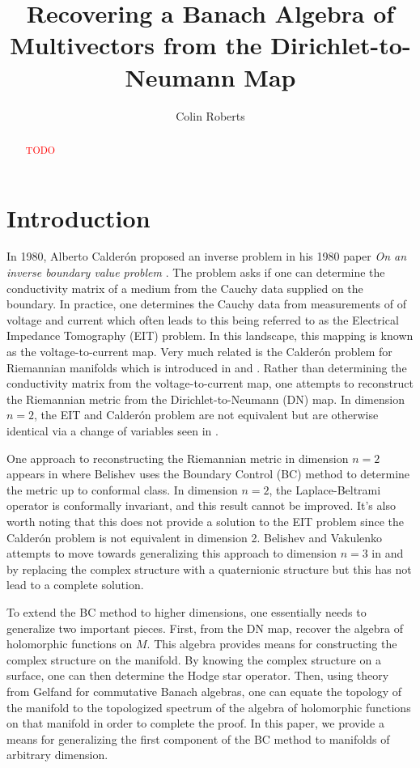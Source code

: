\documentclass[12pt]{article}
\title{Recovering a Banach Algebra of Multivectors from the Dirichlet-to-Neumann Map}
\author{Colin Roberts}
\begin{document}
 \begin{titlingpage}
     \maketitle
     \vfill
     \begin{abstract}
        \textcolor{red}{TODO}
     \end{abstract}
 \end{titlingpage}

\section{Introduction}

In 1980, Alberto Calder\'on proposed an inverse problem in his 1980 paper \emph{On an inverse boundary value problem} \cite{calderon_inverse_2006}. The problem asks if one can determine the conductivity matrix of a medium from the Cauchy data supplied on the boundary.  In practice, one determines the Cauchy data from measurements of of voltage and current which often leads to this being referred to as the Electrical Impedance Tomography (EIT) problem.  In this landscape, this mapping is known as the voltage-to-current map. Very much related is the Calder\'on problem for Riemannian manifolds which is introduced in \cite{feldman_calderproblem_nodate} and \cite{salo_calderon_nodate}.  Rather than determining the conductivity matrix from the voltage-to-current map, one attempts to reconstruct the Riemannian metric from the Dirichlet-to-Neumann (DN) map.  In dimension $n=2$, the EIT and Calder\'on problem are not equivalent but are otherwise identical via a change of variables seen in \cite{uhlmann_inverse_2014}.

One approach to reconstructing the Riemannian metric in dimension $n=2$ appears in \cite{belishev_calderon_2003} where Belishev uses the Boundary Control (BC) method to determine the metric up to conformal class. In dimension $n=2$, the Laplace-Beltrami operator is conformally invariant, and this result cannot be improved.  It's also worth noting that this does not provide a solution to the EIT problem since the Calder\'on problem is not equivalent in dimension 2.  Belishev and Vakulenko attempts to move towards generalizing this approach to dimension $n=3$ in \cite{belishev_algebras_2017} and \cite{belishev_algebraic_2019} by replacing the complex structure with a quaternionic structure but this has not lead to a complete solution.

To extend the BC method to higher dimensions, one essentially needs to generalize two important pieces. First, from the DN map, recover the algebra of holomorphic functions on $M$.  This algebra provides means for constructing the complex structure on the manifold. By knowing the complex structure on a surface, one can then determine the Hodge star operator. Then, using theory from Gelfand for commutative Banach algebras, one can equate the topology of the manifold to the topologized spectrum of the algebra of holomorphic functions on that manifold in order to complete the proof. In this paper, we provide a means for generalizing the first component of the BC method to manifolds of arbitrary dimension. 
\end{document}

